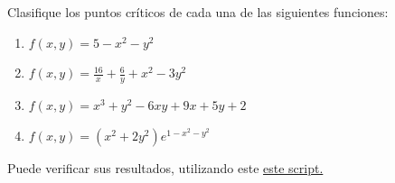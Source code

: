 \begin{problema}
	Clasifique los puntos cr\'iticos de cada una de las siguientes funciones:
	\begin{enumerate}
		\item $f(x,y)=5-x^2-y^2$
		\item $f(x,y)=\frac{16}{x}+\frac{6}{y}+x^2-3y^2$
		\item $f(x,y)=x^3+y^2-6xy+9x+5y+2$
		\item $f(x,y)=(x^2+2y^{2})e^{1-x^2-y^2}$
	\end{enumerate}
	
\end{problema}

Puede verificar sus resultados, utilizando este \href{http://sagecell.sagemath.org/?z=eJyVVMGK2zAQvRv8D4NyWBu8ISz00l33slnIpaW0x9JdxrJMBYoUJDvYn9MP2FM_IT_WkWIr3iQLbUISWXrz3szoTRa14Aotbo0DhQ72aCVWSrg06YuhpMfshhY3-X2apMmiFo3U0oN1J1xrEZpOc3n4o8NhJYDjtpJoiQyO4HBKa78zgf0j8k7Y2gAq2FlDkltMkybrCxhyKOHDbf98dzs833ndnRVtO7zsrNRtxjwoYFgBx3VO6hwV71QsZIeWSwyFNH0AldAsa9lQRH7B2M8p-4mzGabtMXK4jBzmkUPM5rtRHZdGj_mA4B1OpVPBnW4NcHt4bSU3npPIgD0FkNHCXUGxM-kxzQIYia_YeWZjLrNjJV1bOqP2IvsxtaRcxaxp_bOA0P6Y0FSFcKTeGDumJDV4so9pAvR6IxsAvgGPp-ugUn4J5yRqAwO4DmrpuJVbqVG3Ik02ZbMcAdlJezOGnNcdDmDugc3U9fWxkOPzshbtjG4914R3ydcz3nX0QT-2KxrofSO9dVK00kLsUXVHN9AntMnFu3X3x7kR4ZCQxpIH-hLpNsrKe5kcFAgsAWuEjlpJM0QjaMjgWK7SpPJfsdxHmgHZSB5NdyHJLgfr6dxzcJKlfLBkBRYMKvqtLkpfZ0i7U-f8-tqYnTC-OSMqTWQzxjysrrmKZUGZ3lXBcgpmlM7XkCpV5qRS6B0uVOT5NPHQzqQU9_6N__Ph1f_VwTehsJV74xV8ZFCZOB_-l_N3f84plBNXi_5iwPl7E1QjmVlY717L8r-wl8z7&lang=sage}{este script.}


% 
% 
% 
% 
% 
% 
% 
% 
% 
% 
% 

